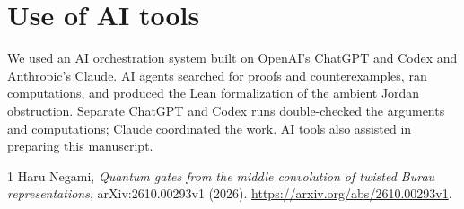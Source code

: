 \documentclass[11pt,a4paper]{article}
\begin{document}
\section*{Use of AI tools}

We used an AI orchestration system built on OpenAI's ChatGPT and Codex
and Anthropic's Claude. AI agents searched for proofs and counterexamples,
ran computations, and produced the Lean formalization of the ambient
Jordan obstruction. Separate ChatGPT and Codex runs double-checked
the arguments and computations; Claude coordinated the work.
AI tools also assisted in preparing this manuscript.

\begin{thebibliography}{1}
Haru Negami,
\emph{Quantum gates from the middle convolution of twisted Burau
representations}, arXiv:2610.00293v1 (2026).
\url{https://arxiv.org/abs/2610.00293v1}.
\end{thebibliography}
\end{document}
